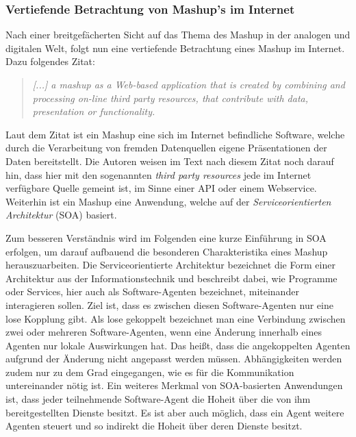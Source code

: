 \documentclass[11pt]{article}
\newcommand{\com}[1]{\marginpar{\em {\small{#1}}}} %
\begin{document}
%
%
\subsubsection{Vertiefende Betrachtung von Mashup's im Internet}

Nach einer breitgefächerten Sicht auf das Thema des Mashup in der analogen und digitalen Welt, folgt nun eine vertiefende Betrachtung eines Mashup im Internet. Dazu folgendes Zitat:

%
%
\begin{quote} 
    \emph{[...] a mashup as a Web-based application that is created by combining and processing on-line third party resources, that contribute with data, presentation or functionality.} \\
    \cite[S. 2]{MASHUP-DEVELOPTOOLS}
\end{quote}

\noindent
Laut dem Zitat ist ein Mashup eine sich im Internet befindliche Software, welche durch die Verarbeitung von fremden Datenquellen eigene Präsentationen der Daten bereitstellt. Die Autoren weisen im Text nach diesem Zitat noch darauf hin, dass hier mit den sogenannten \emph{third party resources} jede im Internet verfügbare Quelle gemeint ist, im Sinne einer API oder einem Webservice. Weiterhin ist ein Mashup eine Anwendung, welche auf der \textit{Serviceorientierten Architektur} (SOA)\com{SOA}\cite{SOA-INTRO} basiert. 


\newpage 
\noindent
Zum besseren Verständnis wird im Folgenden eine kurze Einführung in SOA erfolgen, um darauf aufbauend die besonderen Charakteristika eines Mashup herauszuarbeiten. Die Serviceorientierte Architektur bezeichnet die Form einer Architektur aus der Informationstechnik und beschreibt dabei, wie Programme oder Services, hier auch als Software-Agenten bezeichnet, miteinander interagieren sollen. Ziel ist, dass es zwischen diesen Software-Agenten nur eine lose Kopplung gibt. Als lose gekoppelt bezeichnet man eine Verbindung zwischen zwei oder mehreren Software-Agenten, wenn eine Änderung innerhalb eines Agenten nur lokale Auswirkungen hat. Das heißt, dass die angekoppelten Agenten aufgrund der Änderung nicht angepasst werden müssen. Abhängigkeiten werden zudem nur zu dem Grad eingegangen, wie es für die Kommunikation untereinander nötig ist. \cite[S. 1 ff]{SOA-WHAT-IS} \cite[S. 131]{LOOSELY-COUPLED} Ein weiteres Merkmal von SOA-basierten Anwendungen ist, dass jeder teilnehmende Software-Agent die Hoheit über die von ihm bereitgestellten Dienste besitzt. Es ist aber auch möglich, dass ein Agent weitere Agenten steuert und so indirekt die Hoheit über deren Dienste besitzt.
\end{document}
